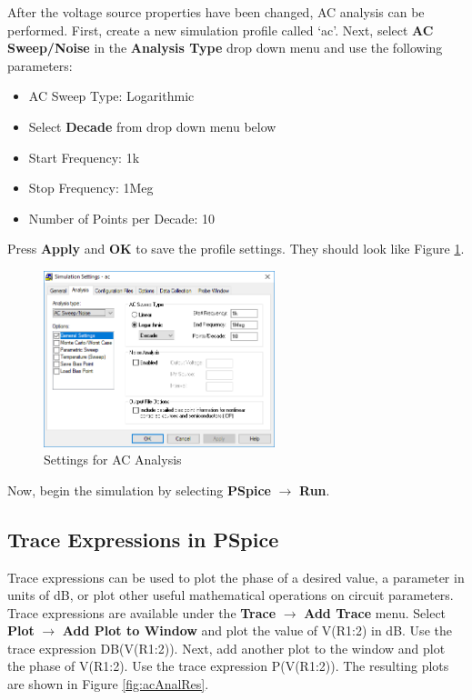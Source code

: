 \documentclass[12pt]{../manual}
\begin{document}
After the voltage source properties have been changed, AC analysis can be performed. First, create a new simulation profile called `ac'. Next, select \textbf{AC Sweep/Noise} in the \textbf{Analysis Type} drop down menu and use the following parameters:
\begin{itemize}
\item AC Sweep Type: Logarithmic 
\item Select \textbf{Decade} from drop down menu below
\item Start Frequency: 1k
\item Stop Frequency: 1Meg
\item Number of Points per Decade: 10
\end{itemize}
Press \textbf{Apply} and \textbf{OK} to save the profile settings. They should look like Figure \ref{fig:acSettings}.

\newpage
\begin{figure}[ht!]
	\begin{center}
		\includegraphics[width=0.6\textwidth]{figures/ACAnalysisSettings.PNG}
	\end{center}
	\caption{Settings for AC Analysis}
	\label{fig:acSettings}
\end{figure}

Now, begin the simulation by selecting \textbf{PSpice} $\to$ \textbf{Run}.

\subsection*{Trace Expressions in PSpice}
Trace expressions can be used to plot the phase of a desired value, a parameter in units of dB, or plot other useful mathematical operations on circuit parameters. Trace expressions are available under the \textbf{Trace} $\to$ \textbf{Add Trace} menu. Select \textbf{Plot} $\to$ \textbf{Add Plot to Window} and plot the value of V(R1:2) in dB. Use the trace expression DB(V(R1:2)). Next, add another plot to the window and plot the phase of V(R1:2). Use the trace expression P(V(R1:2)). The resulting plots are shown in Figure \ref{fig:acAnalRes}.
\end{document}
